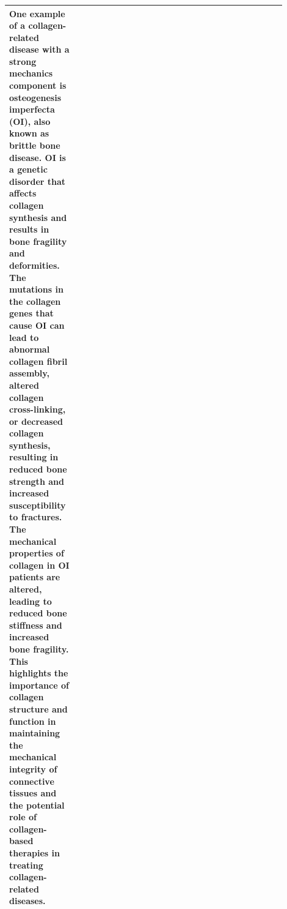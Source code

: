 \begin{longtable}{|p{0.2\linewidth}|p{0.35\linewidth}|p{0.35\linewidth}|}
\newline\newline
One example of a collagen-related disease with a strong mechanics component is osteogenesis imperfecta (OI), also known as brittle bone disease. OI is a genetic disorder that affects collagen synthesis and results in bone fragility and deformities. The mutations in the collagen genes that cause OI can lead to abnormal collagen fibril assembly, altered collagen cross-linking, or decreased collagen synthesis, resulting in reduced bone strength and increased susceptibility to fractures. The mechanical properties of collagen in OI patients are altered, leading to reduced bone stiffness and increased bone fragility. This highlights the importance of collagen structure and function in maintaining the mechanical integrity of connective tissues and the potential role of collagen-based therapies in treating collagen-related diseases. \\ \hline


\end{longtable}
